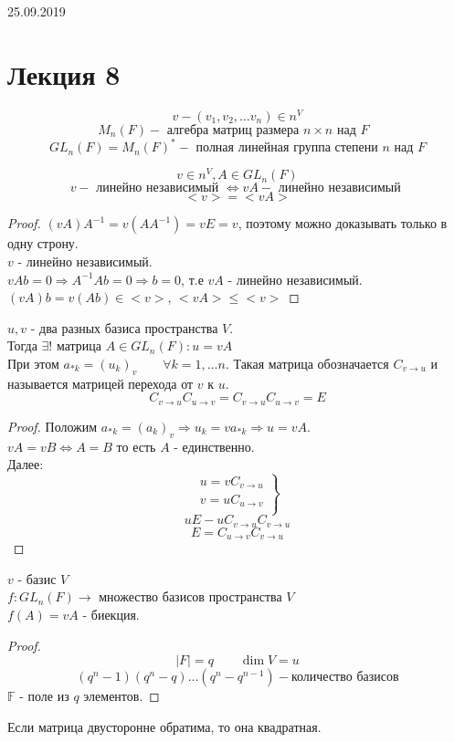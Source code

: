 \documentclass[12pt]{report}
\begin{document}
25.09.2019
\section{Лекция 8}
$$v - (v_1, v_2 , \ldots v_n) \in n^V$$%
$$M_n(F) - \mbox{ алгебра матриц размера $n \times n$ над $F$ }$$
$$ GL_n(F) = M_n(F)^* - \mbox{ полная линейная группа степени $n$ над $F$}$$

\begin{lm}
    $$ v \in n^V , A \in GL_n(F)$$
    $$ v - \mbox{ линейно независимый } \Leftrightarrow vA - \mbox{ линейно независимый }$$
    $$ <v> = <vA> $$
\end{lm}
\begin{proof}
    $(vA)A^{-1} = v(AA^{-1}) = vE = v$, поэтому можно доказывать только в одну строну.\\
    $v$ - линейно независимый.\\
    $vAb = 0 \Rightarrow A^{-1} Ab = 0 \Rightarrow b = 0$, т.е $vA$ - линейно независимый. \\
    $(vA)b = v(Ab) \in <v>$, $<vA> \le <v>$
\end{proof}
\begin{st}
    $u, v$ - два разных базиса пространства $V$.\\
    Тогда $\exists ! $ матрица $A \in GL_n(F) : u = vA$\\
    При этом $a_{*k} =(u_k)_v \qquad \forall k = {1, \ldots n}$. Такая матрица обозначается $C_{v\to u}$ и называется матрицей перехода от $v$ к $u$.
    $$ C_{v\to u} C_{u\to v} = C_{v\to u} C_{u\to v} = E$$
\end{st}

\begin{proof}
    Положим $a_{*k} = (a_k)_v \Rightarrow u_k = v a_{*k} \Rightarrow u = vA$. \\
    $vA=vB \Leftrightarrow A = B$ то есть $A$ - единственно.\\
    Далее:\\
    $$ \left. 
	    \begin{array}{rcl}
		u = v C_{v \to u}\\ 
		v = u C_{u \to v}\\
	    \end{array}
	\right \}
	$$
    $$ uE - u C_{v \to u} C_{v \to u} $$
    $$ E = C_{u \to v} C_{v \to u}$$
\end{proof}
\begin{cor}
    $v$ - базис $V$\\
    $f: GL_n(F) \to$ множество базисов пространства $V$\\
    $f(A) = vA$ - биекция.
\end{cor}
\begin{proof}
    $$|F| = q \qquad \dim V = u$$
    $$(q^n -1)(q^n - q) \ldots (q^{n} - q^{n-1}) - \mbox{количество базисов}$$
    $ \mathbb F $ - поле из $q$ элементов.
\end{proof}
\begin{st}
    Если матрица двусторонне обратима, то она квадратная.
\end{st}
\end{document}
